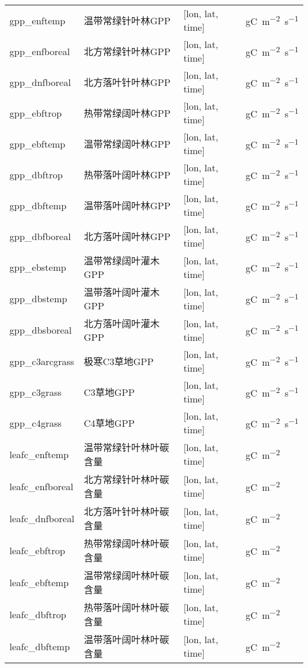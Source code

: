 \documentclass[a4paper,12pt,twoside]{article}
\begin{document}
{\begin{longtable}[htbp]{lp{}ll}
gpp\_enftemp & 温带常绿针叶林GPP & {[}lon, lat, time{]} & \unit{gC.m^{-2}.s^{-1}} \\
gpp\_enfboreal & 北方常绿针叶林GPP & {[}lon, lat, time{]} & \unit{gC.m^{-2}.s^{-1}} \\
gpp\_dnfboreal & 北方落叶针叶林GPP & {[}lon, lat, time{]} & \unit{gC.m^{-2}.s^{-1}} \\
gpp\_ebftrop & 热带常绿阔叶林GPP & {[}lon, lat, time{]} & \unit{gC.m^{-2}.s^{-1}} \\
gpp\_ebftemp & 温带常绿阔叶林GPP & {[}lon, lat, time{]} & \unit{gC.m^{-2}.s^{-1}} \\
gpp\_dbftrop & 热带落叶阔叶林GPP & {[}lon, lat, time{]} & \unit{gC.m^{-2}.s^{-1}} \\
gpp\_dbftemp & 温带落叶阔叶林GPP & {[}lon, lat, time{]} & \unit{gC.m^{-2}.s^{-1}} \\
gpp\_dbfboreal & 北方落叶阔叶林GPP & {[}lon, lat, time{]} & \unit{gC.m^{-2}.s^{-1}} \\
gpp\_ebstemp & 温带常绿阔叶灌木GPP & {[}lon, lat, time{]} & \unit{gC.m^{-2}.s^{-1}} \\
gpp\_dbstemp & 温带落叶阔叶灌木GPP & {[}lon, lat, time{]} & \unit{gC.m^{-2}.s^{-1}} \\
gpp\_dbsboreal & 北方落叶阔叶灌木GPP & {[}lon, lat, time{]} & \unit{gC.m^{-2}.s^{-1}} \\
gpp\_c3arcgrass & 极寒C3草地GPP & {[}lon, lat, time{]} & \unit{gC.m^{-2}.s^{-1}} \\
gpp\_c3grass & C3草地GPP & {[}lon, lat, time{]} & \unit{gC.m^{-2}.s^{-1}} \\
gpp\_c4grass & C4草地GPP & {[}lon, lat, time{]} & \unit{gC.m^{-2}.s^{-1}} \\
leafc\_enftemp & 温带常绿针叶林叶碳含量 & {[}lon, lat, time{]} & \unit{gC.m^{-2}} \\
leafc\_enfboreal & 北方常绿针叶林叶碳含量 & {[}lon, lat, time{]} & \unit{gC.m^{-2}} \\
leafc\_dnfboreal & 北方落叶针叶林叶碳含量 & {[}lon, lat, time{]} & \unit{gC.m^{-2}} \\
leafc\_ebftrop & 热带常绿阔叶林叶碳含量 & {[}lon, lat, time{]} & \unit{gC.m^{-2}} \\
leafc\_ebftemp & 温带常绿阔叶林叶碳含量 & {[}lon, lat, time{]} & \unit{gC.m^{-2}} \\
leafc\_dbftrop & 热带落叶阔叶林叶碳含量 & {[}lon, lat, time{]} & \unit{gC.m^{-2}} \\
leafc\_dbftemp & 温带落叶阔叶林叶碳含量 & {[}lon, lat, time{]} & \unit{gC.m^{-2}} \\

\end{longtable}}
\end{document}
